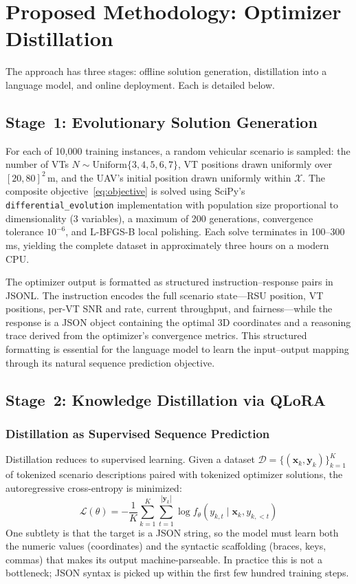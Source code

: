 \documentclass[journal]{IEEEtran}
\begin{document}
\section{Proposed Methodology: Optimizer Distillation}
\label{sec:method}

The approach has three stages: offline solution generation, distillation into a language model, and online deployment. Each is detailed below.

\subsection{Stage~1: Evolutionary Solution Generation}

For each of 10{,}000 training instances, a random vehicular scenario is sampled: the number of VTs $N \sim \text{Uniform}\{3,4,5,6,7\}$, VT positions drawn uniformly over $[20,80]^2$\,m, and the UAV's initial position drawn uniformly within $\mathcal{X}$. The composite objective~\eqref{eq:objective} is solved using SciPy's \texttt{differential\_evolution} implementation \cite{storn1997} with population size proportional to dimensionality (3 variables), a maximum of 200 generations, convergence tolerance $10^{-6}$, and L-BFGS-B local polishing. Each solve terminates in 100--300\,ms, yielding the complete dataset in approximately three hours on a modern CPU.

The optimizer output is formatted as structured instruction--response pairs in JSONL. The instruction encodes the full scenario state---RSU position, VT positions, per-VT SNR and rate, current throughput, and fairness---while the response is a JSON object containing the optimal 3D coordinates and a reasoning trace derived from the optimizer's convergence metrics. This structured formatting is essential for the language model to learn the input--output mapping through its natural sequence prediction objective.

\subsection{Stage~2: Knowledge Distillation via QLoRA}

\subsubsection{Distillation as Supervised Sequence Prediction}

Distillation reduces to supervised learning. Given a dataset $\mathcal{D} = \{(\mathbf{x}_k, \mathbf{y}_k)\}_{k=1}^{K}$ of tokenized scenario descriptions paired with tokenized optimizer solutions, the autoregressive cross-entropy is minimized:
\begin{equation}
    \mathcal{L}(\theta) = -\frac{1}{K}\sum_{k=1}^{K} \sum_{t=1}^{|\mathbf{y}_k|} \log f_\theta(y_{k,t} \mid \mathbf{x}_k, y_{k,<t})
    \label{eq:loss}
\end{equation}
One subtlety is that the target is a JSON string, so the model must learn both the numeric values (coordinates) and the syntactic scaffolding (braces, keys, commas) that makes its output machine-parseable. In practice this is not a bottleneck; JSON syntax is picked up within the first few hundred training steps.
\end{document}
